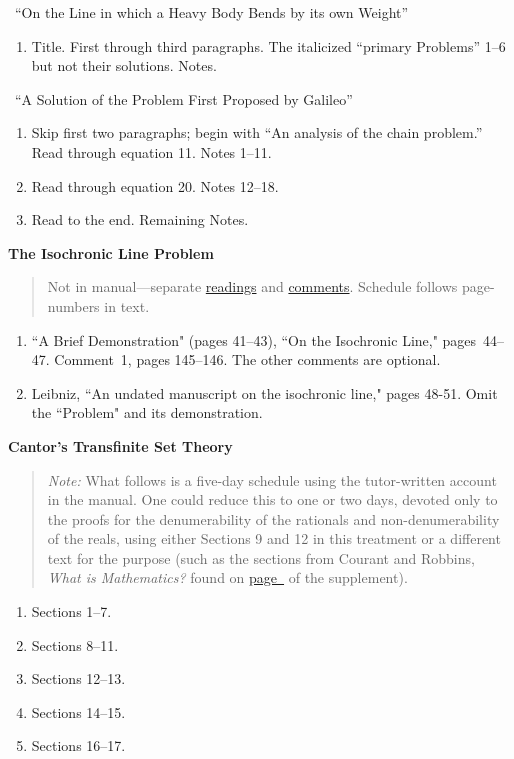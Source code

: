 \documentclass[10pt]{article}
\begin{document}
{\ ``On the Line in which a Heavy Body Bends
by its own Weight''
\begin{enumerate}[noitemsep]  \item Title.
		First through third paragraphs. The
		italicized ``primary Problems'' 1--6 but not
		their solutions. Notes.  \end{enumerate} 

\ ``A Solution of the Problem First Proposed by
Galileo'' 
\begin{enumerate}[resume*]
	\item Skip first two paragraphs; begin with ``An analysis of the
	chain problem.'' Read through equation 11. Notes
	1--11. 
\item Read through equation 20. Notes
	12--18. \item Read to the end. Remaining
	Notes.
	\end{enumerate} 
\textbf{The Isochronic Line Problem}
\label{LeibnizIso}
\vspace{-0.7em} 
\begin{quote}
{\small Not in manual---separate \href{https://drive.google.com/file/d/13w3nTIpDN1F0sgImLWWRaLF5vg2cF6BL/view?usp=sharing}{readings} and \href{https://drive.google.com/file/d/140fF6SF7omRfQ-sFkhHiBlaNOiBiNvUq/view?usp=sharing}{comments}. Schedule follows page-numbers in text.}
\end{quote}

\begin{enumerate}
\item ``A Brief Demonstration" (pages 41--43), ``On the Isochronic Line," pages~44--47.  Comment~1, pages 145--146.  The other comments are optional.

\item Leibniz, ``An undated manuscript on the isochronic line," pages 48-51.  Omit the ``Problem" and its demonstration.
\end{enumerate}


\textbf{Cantor's Transfinite Set Theory}
\label{Cantor}
\vspace{-0.7em}
\begin{quote}
	\small{\emph{Note:} What follows is a five-day schedule 
using the tutor-written account 
in the manual. One could reduce this to one or two days,
devoted only to the proofs for the denumerability of
the rationals and non-denumerability of the reals,
using either 
Sections 9 and 12 in this treatment or
a different text for the purpose  (such as
the sections from Courant and Robbins, \emph{What
	is Mathematics?} found on
\hyperref[supple.59]{page~\pageref{supple.59}} of the
supplement).}
\end{quote}
\begin{enumerate}[noitemsep]
	\item Sections 1--7.
	\item Sections 8--11.
	\item Sections 12--13.
	\item Sections 14--15.
	\item Sections 16--17.
\end{enumerate}

}
\end{document}
